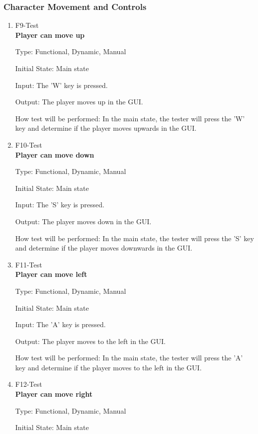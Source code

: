 \documentclass[12pt, titlepage]{article}
\begin{document}
\subsubsection{Character Movement and Controls}

\begin{enumerate}

\item{F9-Test} \\
\textbf{Player can move up}

Type: Functional, Dynamic, Manual
					
Initial State: Main state
					
Input: The 'W' key is pressed.
					
Output: The player moves up in the GUI.
					
How test will be performed: In the main state, the tester will press the 'W' key and determine if the player moves upwards in the GUI.

\item{F10-Test} \\
\textbf{Player can move down}

Type: Functional, Dynamic, Manual
					
Initial State: Main state
					
Input: The 'S' key is pressed.
					
Output: The player moves down in the GUI.
					
How test will be performed: In the main state, the tester will press the 'S' key and determine if the player moves downwards in the GUI.

\item{F11-Test} \\
\textbf{Player can move left}

Type: Functional, Dynamic, Manual
					
Initial State: Main state
					
Input: The 'A' key is pressed.
					
Output: The player moves to the left in the GUI.
					
How test will be performed: In the main state, the tester will press the 'A' key and determine if the player moves to the left in the GUI.

\item{F12-Test} \\
\textbf{Player can move right}

Type: Functional, Dynamic, Manual
					
Initial State: Main state
					

\end{enumerate}
\end{document}
